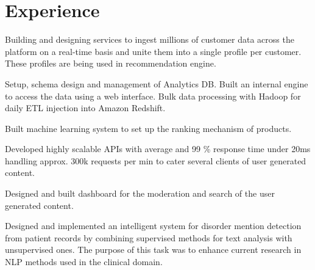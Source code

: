 \documentclass[]{rajnikant-resume-openfont}
\begin{document}
\begin{minipage}[t]{0.66\textwidth} 


\section{Experience}

\vspace{\topsep} %
\begin{tightemize}
\item {}  Building and designing services to ingest millions of customer data across the platform on a
real-time basis and unite them into a single profile per customer. These profiles are being used in recommendation engine.
\item {} Setup, schema design and management of Analytics DB. Built an internal engine to
access the data using a web interface. Bulk data processing with Hadoop for daily ETL injection into Amazon Redshift.

\end{tightemize}
\sectionsep


\begin{tightemize}
\item Built machine learning system to set up the ranking mechanism of products. 
\item Developed highly scalable APIs with average and 99 \% response time under 20ms handling approx. 300k requests per min to cater several clients of user generated content.
\item Designed and built dashboard for the moderation  and search of the user generated content.
\end{tightemize}
\sectionsep

\begin{tightemize}
\item  {} Designed and implemented an intelligent system for disorder mention detection from
patient records by combining supervised methods for text analysis with unsupervised ones. The purpose of this
task was to enhance current research in NLP methods used in the clinical domain.
\end{tightemize}


\end{minipage}
\end{document}

